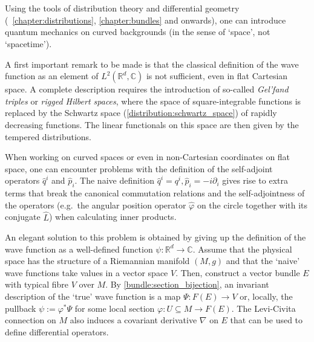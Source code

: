 \section{}

    Using the tools of distribution theory and differential geometry (~\ref{chapter:distributions}, \ref{chapter:bundles} and onwards), one can introduce quantum mechanics on curved backgrounds (in the sense of `space', not `spacetime').

    \begin{remark}
        A first important remark to be made is that the classical definition of the wave function as an element of $L^2(\mathbb{R}^d,\mathbb{C})$ is not sufficient, even in flat Cartesian space. A complete description requires the introduction of so-called \textit{Gel'fand triples} or \textit{rigged Hilbert spaces}, where the space of square-integrable functions is replaced by the Schwartz space (\cref{distribution:schwartz_space}) of rapidly decreasing functions. The linear functionals on this space are then given by the tempered distributions.
    \end{remark}

    When working on curved spaces or even in non-Cartesian coordinates on flat space, one can encounter problems with the definition of the self-adjoint operators $\hat{q}^i$ and $\hat{p}_i$. The naive definition $\hat{q}^i = q^i,\hat{p}_i = -i\partial_i$ gives rise to extra terms that break the canonical commutation relations and the self-adjointness of the operators (e.g.~the angular position operator $\hat{\varphi}$ on the circle together with its conjugate $\hat{L}$) when calculating inner products.

    An elegant solution to this problem is obtained by giving up the definition of the wave function as a well-defined function $\psi:\mathbb{R}^d\rightarrow\mathbb{C}$. Assume that the physical space has the structure of a Riemannian manifold $(M,g)$ and that the `naive' wave functions take values in a vector space $V$. Then, construct a vector bundle $E$ with typical fibre $V$ over $M$. By \cref{bundle:section_bijection}, an invariant description of the `true' wave function is a map $\Psi:F(E)\rightarrow V$ or, locally, the pullback $\psi:=\varphi^*\Psi$ for some local section $\varphi:U\subseteq M\rightarrow F(E)$. The Levi-Civita connection on $M$ also induces a covariant derivative $\nabla$ on $E$ that can be used to define differential operators.

